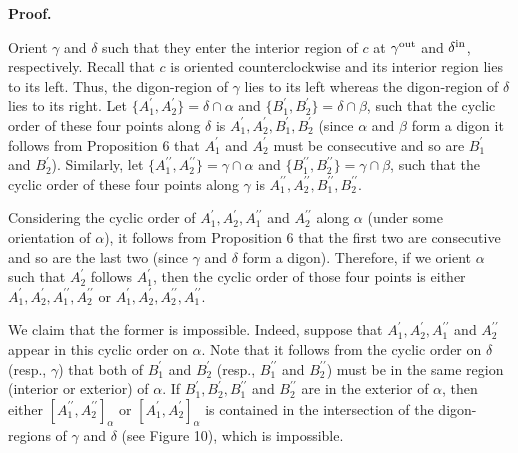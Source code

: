 \par
\par
\par\medskip\noindent\textbf{Proof.}\par
Orient $\gamma$ and $\delta$ such that they enter the interior region of $c$ at $\gamma^{\rm out}$ and $\delta^{\rm in}$, respectively. Recall that $c$ is oriented counterclockwise and its interior region lies to its left. Thus, the digon-region of $\gamma$ lies to its left whereas the digon-region of $\delta$ lies to its right. Let $\{A^{\prime}_{1},A^{\prime}_{2}\}=\delta\cap\alpha$ and $\{B^{\prime}_{1},B^{\prime}_{2}\}=\delta\cap\beta$, such that the cyclic order of these four points along $\delta$ is $A^{\prime}_{1},A^{\prime}_{2},B^{\prime}_{1},B^{\prime}_{2}$ (since $\alpha$ and $\beta$ form a digon it follows from Proposition 6 that $A_{1}^{\prime}$ and $A^{\prime}_{2}$ must be consecutive and so are $B^{\prime}_{1}$ and $B^{\prime}_{2}$). Similarly, let $\{A^{\prime\prime}_{1},A^{\prime\prime}_{2}\}=\gamma\cap\alpha$ and $\{B^{\prime\prime}_{1},B^{\prime\prime}_{2}\}=\gamma\cap\beta$, such that the cyclic order of these four points along $\gamma$ is $A^{\prime\prime}_{1},A^{\prime\prime}_{2},B^{\prime\prime}_{1},B^{\prime\prime%
}_{2}$.
\par
\par
Considering the cyclic order of $A^{\prime}_{1},A^{\prime}_{2},A^{\prime\prime}_{1}$ and $A^{\prime\prime}_{2}$ along $\alpha$ (under some orientation of $\alpha$), it follows from Proposition 6 that the first two are consecutive and so are the last two (since $\gamma$ and $\delta$ form a digon). Therefore, if we orient $\alpha$ such that $A^{\prime}_{2}$ follows $A^{\prime}_{1}$, then the cyclic order of those four points is either $A^{\prime}_{1},A^{\prime}_{2},A^{\prime\prime}_{1},A^{\prime\prime}_{2}$ or $A^{\prime}_{1},A^{\prime}_{2},A^{\prime\prime}_{2},A^{\prime\prime}_{1}$.
\par
\par
We claim that the former is impossible. Indeed, suppose that $A^{\prime}_{1},A^{\prime}_{2},A^{\prime\prime}_{1}$ and $A^{\prime\prime}_{2}$ appear in this cyclic order on $\alpha$. Note that it follows from the cyclic order on $\delta$ (resp., $\gamma$) that both of $B^{\prime}_{1}$ and $B^{\prime}_{2}$ (resp., $B^{\prime\prime}_{1}$ and $B^{\prime\prime}_{2}$) must be in the same region (interior or exterior) of $\alpha$. If $B^{\prime}_{1},B^{\prime}_{2},B^{\prime\prime}_{1}$ and $B^{\prime\prime}_{2}$ are in the exterior of $\alpha$, then either $[A^{\prime\prime}_{1},A^{\prime\prime}_{2}]_{\alpha}$ or $[A_{1}^{\prime},A^{\prime}_{2}]_{\alpha}$ is contained in the intersection of the digon-regions of $\gamma$ and $\delta$ (see Figure 10), which is impossible.
